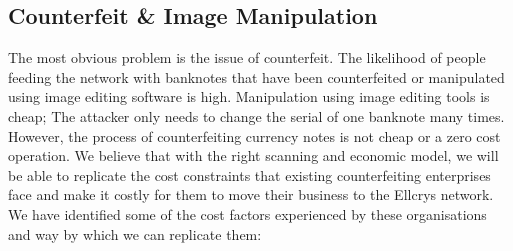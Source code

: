\subsection{Counterfeit \& Image Manipulation}
\label{sec:counterfeit_man}
The most obvious problem is the issue of counterfeit. The likelihood of people feeding the network with banknotes that have been counterfeited or manipulated using image editing software is high. Manipulation using image editing tools is cheap; The attacker only needs to change the serial of one banknote many times. However, the process of counterfeiting currency notes is not cheap or a zero cost operation. We believe that with the right scanning and economic model, we will be able to replicate the cost constraints that existing counterfeiting enterprises face and make it costly for them to move their business to the Ellcrys network. We have identified some of the cost factors experienced by these organisations and way by which we can replicate them:

